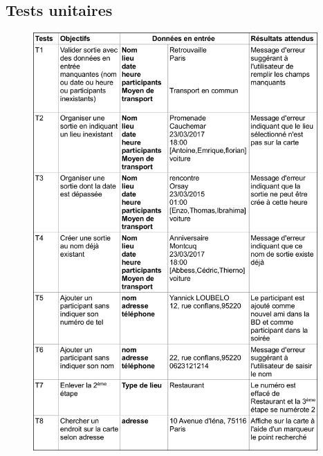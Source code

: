 \documentclass[a4paper, 12pt, notitlepage]{article} %
\begin{document}
\subsection{Tests unitaires}
\begin{figure}[!htb]
    \centering
    \includegraphics[width=0.97\textwidth]{tests_unitaires_1.png}
\end{figure}
\end{document}
